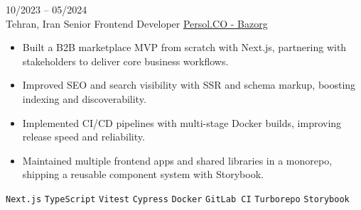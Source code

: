 \entry
{10/2023 -- 05/2024 \\ Tehran, Iran}
{Senior Frontend Developer}
{\href{https://bazorg.com/}{Persol.CO - Bazorg}}
{\vspace{-10pt}
    \begin{itemize}[noitemsep,topsep=0pt,parsep=0pt,partopsep=0pt, leftmargin=-1pt]
        \item Built a B2B marketplace MVP from scratch with Next.js, partnering with stakeholders to deliver core business workflows.
        \item Improved SEO and search visibility with SSR and schema markup, boosting indexing and discoverability.
        \item Implemented CI/CD pipelines with multi-stage Docker builds, improving release speed and reliability.
        \item Maintained multiple frontend apps and shared libraries in a monorepo, shipping a reusable component system with Storybook.
    \end{itemize}
    \texttt{Next.js} \slashsep \texttt{TypeScript} \slashsep \texttt{Vitest} \slashsep \texttt{Cypress} \slashsep \texttt{Docker} \slashsep \texttt{GitLab CI} \slashsep \texttt{Turborepo} \slashsep \texttt{Storybook}
}
